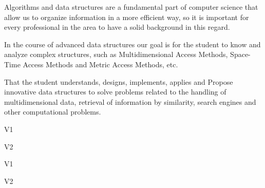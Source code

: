 \begin{syllabus}


\begin{justification}
Algorithms and data structures are a fundamental part of computer science that allow us to organize information in a more efficient way, so it is important for every professional in the area to have a solid background in this regard.

In the course of advanced data structures our goal is for the student to know and analyze complex structures, such as Multidimensional Access Methods, Space-Time Access Methods and Metric Access Methods, etc.
\end{justification}

\begin{goals}
\item That the student understands, designs, implements, applies and
Propose innovative data structures to solve problems related to the handling of multidimensional data, retrieval of information by similarity, search engines and
other computational problems.
\end{goals}

\begin{outcomes}{V1}
   \item {}
   \item {}
   \item {}
\end{outcomes}

\begin{outcomes}{V2}
   \item {}
   \item {}
   \item {}
\end{outcomes}

\begin{competences}{V1}
    \item {} 
    \item {}
    \item {}
\end{competences}

\begin{competences}{V2}
    \item {} 
    \item {}
    \item {}
\end{competences}


\end{syllabus}
